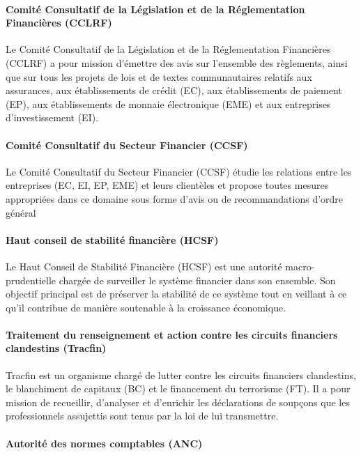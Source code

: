 \documentclass[a4paper, 12pt]{report}
\begin{document}
\paragraph{Comité Consultatif de la Législation et de la Réglementation Financières (CCLRF)}

Le Comité Consultatif de la Législation et de la Réglementation Financières (CCLRF) a pour mission d'émettre des avis sur l'ensemble des règlements, ainsi que sur tous les projets de lois et de textes communautaires relatifs aux assurances, aux établissements de crédit (EC), aux établissements de paiement (EP), aux établissements de monnaie électronique (EME) et aux entreprises d'investissement (EI).

\paragraph{Comité Consultatif du Secteur Financier (CCSF)}

Le Comité Consultatif du Secteur Financier (CCSF)  étudie les relations entre les entreprises (EC, EI, EP, EME) et leurs clientèles et propose toutes mesures appropriées dans ce domaine sous forme d’avis ou de recommandations
d’ordre général

\paragraph{Haut conseil de stabilité financière (HCSF)}

Le Haut Conseil de Stabilité Financière (HCSF) est une autorité macro-prudentielle chargée de surveiller le système financier dans son ensemble. Son objectif principal est de préserver la stabilité de ce système tout en veillant à ce qu'il contribue de manière soutenable à la croissance économique.

\paragraph{Traitement du renseignement et action contre les circuits financiers clandestins (Tracfin)}

Tracfin est un organisme chargé de lutter contre les circuits financiers clandestins, le blanchiment de capitaux (BC) et le financement du terrorisme (FT). Il a pour mission de recueillir, d'analyser et d'enrichir les déclarations de soupçons que les professionnels assujettis sont tenus par la loi de lui transmettre.

\paragraph{Autorité des normes comptables (ANC)}
\end{document}
